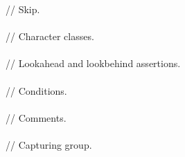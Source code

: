 \begin{figure}

\begin{bigbigpre}
// Skip. \\
 \\
// Character classes. \\
 \\
// Lookahead and lookbehind assertions. \\
 \\
// Conditions. \\
 \\
// Comments. \\
 \\
// Capturing group. \\

\end{bigbigpre}
\end{figure}
